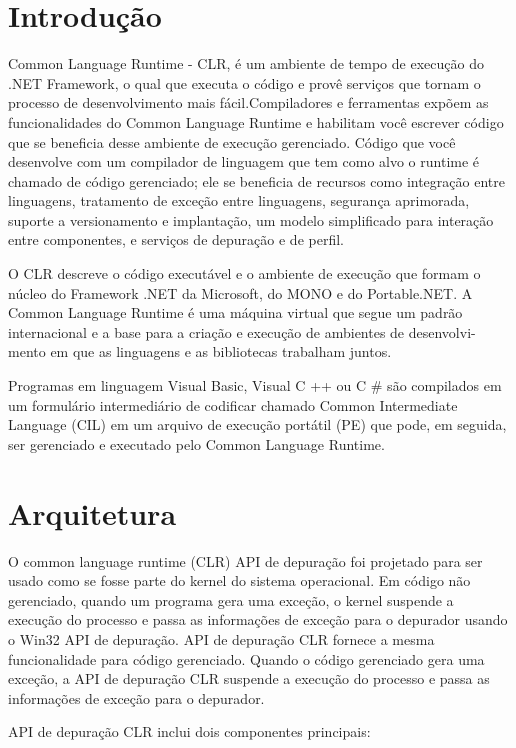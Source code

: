 \documentclass{article}
\begin{document}
\section{Introdução}
Common Language Runtime - CLR, é um ambiente de tempo de execução do .NET Framework, o qual que executa o código e provê serviços que tornam o processo de desenvolvimento mais fácil.Compiladores e ferramentas expõem as funcionalidades do Common Language Runtime e habilitam você escrever código que se beneficia desse ambiente de execução gerenciado. Código que você desenvolve com um compilador de linguagem que tem como alvo o runtime é chamado de código gerenciado; ele se beneficia de recursos como integração entre linguagens, tratamento de exceção entre linguagens, segurança aprimorada, suporte a versionamento e implantação, um modelo simplificado para interação entre componentes, e serviços de depuração e de perfil.

O CLR descreve o código executável e o ambiente de execução que formam
o núcleo do Framework .NET da Microsoft, do MONO e do Portable.NET. A Common Language Runtime é uma máquina virtual que segue um padrão
internacional e a base para a criação e execução de ambientes de desenvolvi-
mento em que as linguagens e as bibliotecas trabalham juntos.

Programas em linguagem Visual Basic, Visual C ++ ou C \# são compilados em um formulário intermediário de codificar chamado Common Intermediate Language (CIL) em um arquivo de execução portátil (PE) que pode, em seguida, ser gerenciado e executado pelo Common Language Runtime.

\section{Arquitetura}

O common language runtime (CLR) API de depuração foi projetado para ser usado como se fosse parte do kernel do sistema operacional. Em código não gerenciado, quando um programa gera uma exceção, o kernel suspende a execução do processo e passa as informações de exceção para o depurador usando o Win32 API de depuração. API de depuração CLR fornece a mesma funcionalidade para código gerenciado. Quando o código gerenciado gera uma exceção, a API de depuração CLR suspende a execução do processo e passa as informações de exceção para o depurador.


API de depuração CLR inclui dois componentes principais:
\end{document}
